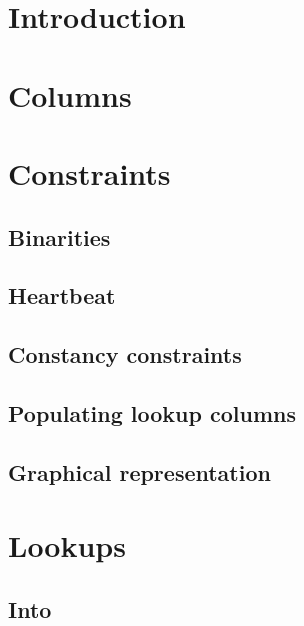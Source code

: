 
\section{Introduction                   \lispNone{}}     \label{gas: purpose}                      
\section{Columns                        }     \label{gas: columns}                       %
\section{Constraints                    } %
\subsection{Binarities                  }     \label{gas: binarities}                    %
\subsection{Heartbeat                   }     \label{gas: heartbeat}                     %
\subsection{Constancy constraints       }     \label{gas: constancies}                   %
\subsection{Populating lookup columns   }     \label{gas: populating lookups}            %
\subsection{Graphical representation    \lispNone{}}     \label{gas: graphical representation}     
\section{Lookups                        } %
\subsection{Into \wcpMod{}              }     \label{gas: lookup into wcp}               %
